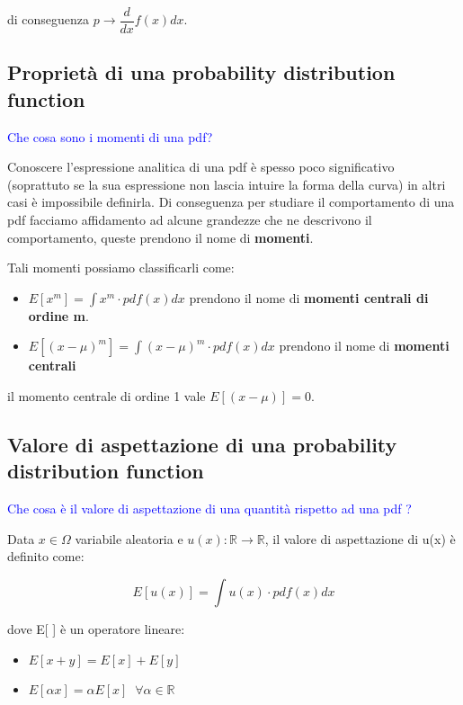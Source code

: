 \noindent di conseguenza $p \rightarrow \dfrac{d}{dx}f(x)dx$.

\subsection{Propriet\`{a} di una probability distribution function}
\textcolor{blue}{Che cosa sono i momenti di una pdf?}\newline

Conoscere l'espressione analitica di una pdf \`{e} spesso poco significativo (soprattuto se la sua espressione non lascia intuire la forma della curva) in altri casi \`{e} impossibile definirla. Di conseguenza per studiare il comportamento di una pdf facciamo affidamento ad alcune grandezze che ne descrivono il comportamento, queste prendono il nome di \textbf{momenti}.

Tali momenti possiamo classificarli come:

\begin{itemize}
	\item $E[x^m] = \int{x^m\cdot pdf(x)dx}$ prendono il nome di \textbf{momenti centrali di ordine m}.
	\item $E[(x-\mu)^m] = \int{(x-\mu)^m \cdot pdf(x)dx}$ prendono il nome di \textbf{momenti centrali}
\end{itemize}

il momento centrale di ordine 1 vale $E[(x-\mu)] = 0$.
\subsection{Valore di aspettazione di una probability distribution function}

\textcolor{blue}{Che cosa \`{e} il valore di aspettazione di una quantit\`{a} rispetto ad una pdf ?}

Data $x \in  \Omega $ variabile aleatoria e $u(x): \mathbb{R} \rightarrow \mathbb{R}$, il valore di aspettazione di u(x) \`{e} definito come:

\begin{equation}
	E[u(x)] = \int{u(x)\cdot pdf(x)dx}
\end{equation}

dove  E[ ] \`{e} un operatore lineare:

\begin{itemize}
	\item $E[x+y] = E[x] + E[y]$
	\item $E[\alpha x] = \alpha E[x] \;\; \forall \alpha \in \mathbb{R}$
\end{itemize}

